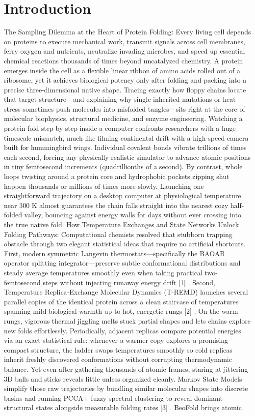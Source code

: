 \documentclass[10pt,letterpaper]{article}
\begin{document}
\section{Introduction}
The Sampling Dilemma at the Heart of Protein Folding: Every living cell depends on proteins to execute mechanical work, transmit signals across cell membranes, ferry oxygen and nutrients, neutralize invading microbes, and speed up essential chemical reactions thousands of times beyond uncatalyzed chemistry. A protein emerges inside the cell as a flexible linear ribbon of amino acids rolled out of a ribosome, yet it achieves biological potency only after folding and packing into a precise three-dimensional native shape. Tracing exactly how floppy chains locate that target structure---and explaining why single inherited mutations or heat stress sometimes push molecules into misfolded tangles---sits right at the core of molecular biophysics, structural medicine, and enzyme engineering. Watching a protein fold step by step inside a computer confronts researchers with a huge timescale mismatch, much like filming continental drift with a high-speed camera built for hummingbird wings. Individual covalent bonds vibrate trillions of times each second, forcing any physically realistic simulator to advance atomic positions in tiny femtosecond increments (quadrillionths of a second). By contrast, whole loops twisting around a protein core and hydrophobic pockets zipping shut happen thousands or millions of times more slowly. Launching one straightforward trajectory on a desktop computer at physiological temperature near 300 K almost guarantees the chain falls straight into the nearest cozy half-folded valley, bouncing against energy walls for days without ever crossing into the true native fold. How Temperature Exchanges and State Networks Unlock Folding Pathways: Computational chemists resolved that stubborn trapping obstacle through two elegant statistical ideas that require no artificial shortcuts. First, modern symmetric Langevin thermostats---specifically the BAOAB operator splitting integrator---preserve subtle conformational distributions and steady average temperatures smoothly even when taking practical two-femtosecond steps without injecting runaway energy drift [1] . Second, Temperature Replica-Exchange Molecular Dynamics (T-REMD) launches several parallel copies of the identical protein across a clean staircase of temperatures spanning mild biological warmth up to hot, energetic rungs [2] . On the warm rungs, vigorous thermal jiggling melts stuck partial shapes and lets chains explore new folds effortlessly. Periodically, adjacent replicas compare potential energies via an exact statistical rule: whenever a warmer copy explores a promising compact structure, the ladder swaps temperatures smoothly so cold replicas inherit freshly discovered conformations without corrupting thermodynamic balance. Yet even after gathering thousands of atomic frames, staring at jittering 3D balls and sticks reveals little unless organized cleanly. Markov State Models simplify those raw trajectories by bundling similar molecular shapes into discrete basins and running PCCA+ fuzzy spectral clustering to reveal dominant structural states alongside measurable folding rates [3] . BeoFold brings atomic 
\end{document}
